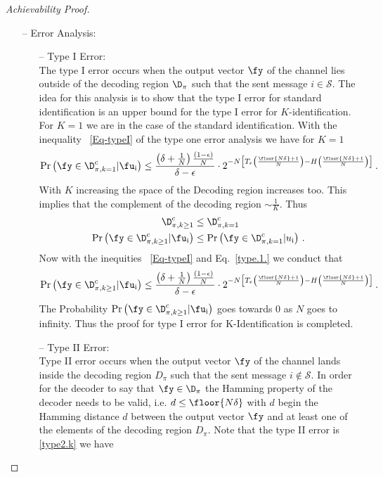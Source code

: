 \begin{proof}[Achievability Proof]
\begin{itemize}
    \item [--] Error Analysis:\\
        \begin{enumerate}
            \item [--] Type I Error:\\
            The type I error occurs when the output vector $\fy$ of the channel lies outside of the decoding region $\D_\pi$ such that the sent message $i \in \mathcal{S}$. The idea for this analysis is to show that the type I error for standard identification is an upper bound for the type I error for $K$-identification.
For $K=1$ we are in the case of the standard identification. With the inequality ~\eqref{Eq-typeI} of the type one error analysis we have for $K=1$
\begin{align}
\label{type.1.}
\Pr\left(\fy\in\D_{\pi,k=1}^c|\fu_\text{i}\right) \leq \frac{\left(\delta+\frac{1}{N}\right)\frac{(1-\epsilon)}{N}}{\delta - \epsilon}\cdot 2^{-N\left[T_\epsilon\left(\frac{\floor{N\delta}+1}{N}\right)-H\left(\frac{\floor{N\delta}+1}{N}\right)\right]} \,.\,
\end{align}
With $K$ increasing the space of the Decoding region increases too. This implies that the complement of the decoding region $\sim \frac{1}{K}$. Thus 
\begin{align}
\label{K_type1}
    \D_{\pi,k\geq1}^c &\leq \D_{\pi,k=1}^c
    \nonumber\\
    \Pr\left(\fy\in\D_{\pi,k\geq1}^c|\fu_\text{i}\right)&\leq \Pr\left(\fy\in\D_{\pi,k=1}^c|u_\text{i}\right)\,.\,
\end{align}
Now with the inequities ~\eqref{Eq-typeI} and Eq.~\eqref{type.1.} we conduct that 
\begin{align}
    \Pr\left(\fy\in\D_{\pi,k\geq1}^c|\fu_\text{i}\right)&\leq \frac{\left(\delta+\frac{1}{N}\right)\frac{(1-\epsilon)}{N}}{\delta - \epsilon}\cdot 2^{-N\left[T_\epsilon\left(\frac{\floor{N\delta}+1}{N}\right)-H\left(\frac{\floor{N\delta}+1}{N}\right)\right]} \,.\,
\end{align}
The Probability $  \Pr\left(\fy\in\D_{\pi,k\geq1}^c|\fu_\text{i}\right)$ goes towards $0$ as $N$ goes to infinity. Thus the proof for type I error for K-Identification is completed.
        \item [--] Type II Error:\\
        Type II error occurs when the output vector $\fy$ of the channel lands inside the decoding region $D_\pi$ such that the sent message $i\notin \mathcal{S}$. In order for the decoder to say that $\fy \in\D_\pi$ the Hamming property of the decoder needs to be valid, i.e. $d\leq \floor{N\delta}$ with $d$ begin the Hamming distance $d$ between the output vector $\fy$ and at least one of the elements of the decoding region $D_\pi$. Note that the type II error is \eqref{type2.k} we have 

\end{enumerate}
\end{itemize}
\end{proof}
